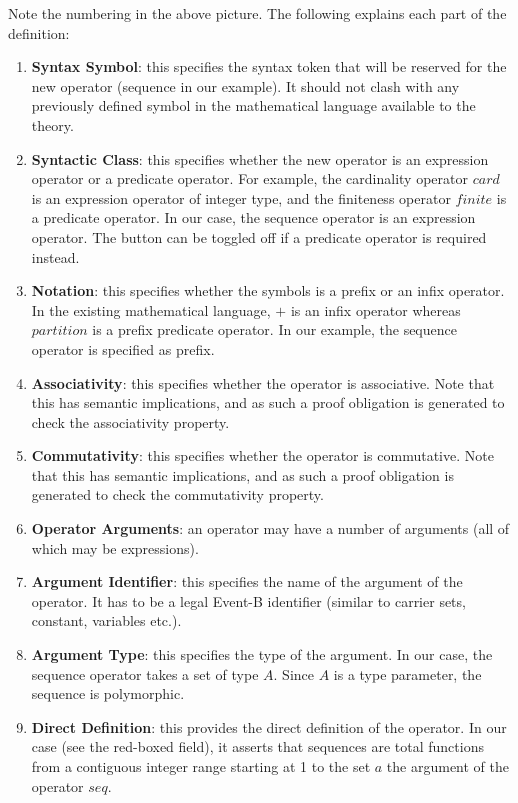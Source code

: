 Note the numbering in the above picture. The following explains each part of the definition:
\begin{enumerate}
	\item \textbf{Syntax Symbol}: this specifies the syntax token that will be reserved for the new operator (sequence in our example). It should not clash with any previously defined symbol in the mathematical language available to the theory.
	\item \textbf{Syntactic Class}: this specifies whether the new operator is an expression operator or a predicate operator. For example, the cardinality operator $card$ is an expression operator of integer type, and the finiteness operator $finite$ is a predicate operator. In our case, the sequence operator is an expression operator. The button can be toggled off if a predicate operator is required instead.
	\item \textbf{Notation}: this specifies whether the symbols is a prefix or an infix operator. In the existing mathematical language, $+$ is an infix operator whereas $partition$ is a prefix predicate operator. In our example, the sequence operator is specified as prefix.
	\item \textbf{Associativity}: this specifies whether the operator is associative. Note that this has semantic implications, and as such a proof obligation is generated to check the associativity property.
	\item \textbf{Commutativity}: this specifies whether the operator is commutative. Note that this has semantic implications, and as such a proof obligation is generated to check the commutativity property.
	\item \textbf{Operator Arguments}: an operator may have a number of arguments (all of which may be expressions).
	\item \textbf{Argument Identifier}: this specifies the name of the argument of the operator. It has to be a legal Event-B identifier (similar to carrier sets, constant, variables etc.).
	\item \textbf{Argument Type}: this specifies the type of the argument. In our case, the sequence operator takes a set of type $A$. Since $A$ is a type parameter, the sequence is polymorphic.
	\item \textbf{Direct Definition}: this provides the direct definition of the operator. In our case (see the red-boxed field), it asserts that sequences are total functions from a contiguous integer range starting at 1 to the set $a$ the argument of the operator $seq$. 
\end{enumerate}

